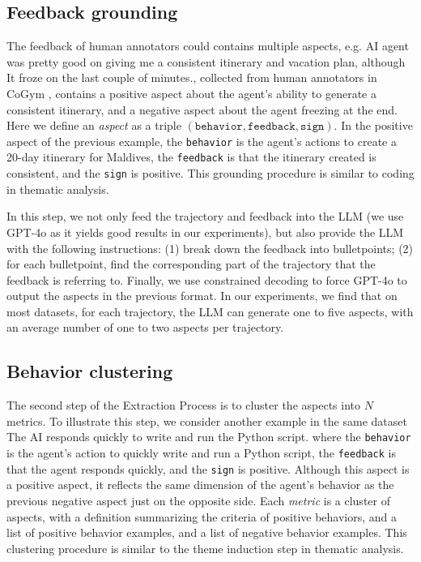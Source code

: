 \subsection{Feedback grounding}
\label{sec:grounding}
The feedback of human annotators could contains multiple aspects, e.g. \textsf{AI agent was pretty good
on giving me a consistent itinerary and vacation plan, although It froze on the last couple of minutes.},
collected from human annotators in CoGym \citep{shao2024collaborative}, contains a positive aspect
about the agent's ability to generate a consistent itinerary, and a negative aspect about the agent freezing
at the end. Here we define an \emph{aspect} as a triple $(\texttt{behavior}, \texttt{feedback}, \texttt{sign})$.
In the positive aspect of the previous example, the \texttt{behavior} is the agent's actions to create
a 20-day itinerary for Maldives, the \texttt{feedback} is that the itinerary created is consistent, 
and the \texttt{sign} is positive. This grounding procedure is similar to coding in thematic analysis.

In this step, we not only feed the trajectory and feedback into the LLM (we use GPT-4o \citep{openai2024gpt4ocard} 
as it yields good results in our experiments), but also provide the LLM with the following instructions:
(1) break down the feedback into bulletpoints; (2) for each bulletpoint, find the corresponding
part of the trajectory that the feedback is referring to. Finally, we use constrained decoding to force GPT-4o
to output the aspects in the previous format. In our experiments, we find that on most datasets, for each
trajectory, the LLM can generate one to five aspects, with an average number of one to two aspects per trajectory.


\subsection{Behavior clustering}
\label{sec:clustering}

The second step of the Extraction Process is to cluster the aspects into $N$ metrics.
To illustrate this step, we consider another example in the same dataset
\textsf{The AI responds quickly to write and run the Python script.} where
the \texttt{behavior} is the agent's action to quickly write and run a Python script, the \texttt{feedback}
is that the agent responds quickly, and the \texttt{sign} is positive. Although this aspect is a positive aspect,
it reflects the same dimension of the agent's behavior as the previous negative aspect just on the opposite side.
Each \emph{metric} is a cluster of aspects, with a definition summarizing the criteria of positive behaviors,
and a list of positive behavior examples, and a list of negative behavior examples. This clustering procedure
is similar to the theme induction step in thematic analysis.

